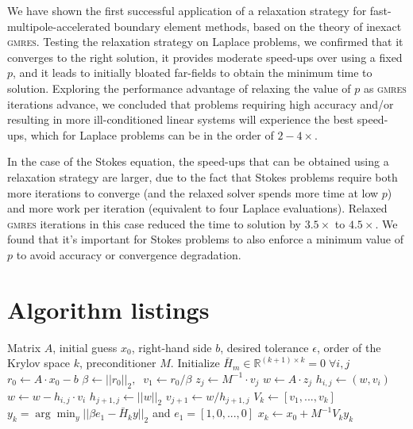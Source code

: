 \documentclass[final,leqno,]{siamltex1213}
\newcommand{\R}{\mathbb{R}}
\newcommand{\gmres}{\textsc{gmres}\xspace}
\begin{document}
We have shown the first successful application of a relaxation strategy for fast-multipole-accelerated boundary element methods, based on the theory of inexact \gmres. Testing the relaxation strategy on Laplace problems, we confirmed that it converges to the right solution, it provides moderate speed-ups over using a fixed $p$, and it leads to initially bloated far-fields to obtain the minimum time to solution.
Exploring the performance advantage of relaxing the value of $p$ as \gmres iterations advance, we concluded that problems requiring high accuracy and/or resulting in more ill-conditioned linear systems will experience the best speed-ups, which for Laplace problems can be in the order of $2-4\times$.

In the case of the Stokes equation, the speed-ups that can be obtained using a relaxation strategy are larger, due to the fact that Stokes problems require both more iterations to converge (and the relaxed solver spends more time at low $p$) and more work per iteration (equivalent to four Laplace evaluations). Relaxed \gmres iterations in this case reduced the time to solution by $3.5\times$ to $4.5\times$. We found that it's important for Stokes problems to also enforce a minimum value of $p$ to avoid accuracy or convergence degradation.


\Appendix
\section{Algorithm listings}\label{sec:algorithms}
 
 \begin{algorithm}
 \footnotesize
	\caption{Right-preconditioned \gmres\ \cite{SaadSchultz1986}.}
	\label{alg:gmres}
	\begin{algorithmic}
		\Require Matrix $A$, initial guess $x_{0}$, right-hand side $b$, desired tolerance $\epsilon$, order of the Krylov space $k$, preconditioner $M$.
		\State Initialize $\bar{H}_{m} \in \R^{(k+1)\times k} = 0\;\forall i,j$
		\State $r_{0} \gets A\cdot x_{0}-b$
		\State $\beta \gets ||r_{0}||_{2},\;\; v_{1} \gets r_{0}/\beta$
			\State $z_{j} \gets M^{-1}\cdot v_{j}$
			\State $w \gets A\cdot z_{j}$
				\State $h_{i,j} \gets (w, v_{i})$
				\State $w \gets w - h_{i,j}\cdot v_{i}$
			\EndFor
			\State $h_{j+1,j} \gets ||w||_{2}$
			\State $v_{j+1} \gets w / h_{j+1,j}$
		\EndFor
		\State $V_{k} \gets [ v_{1}, ..., v_{k}]$
		\State $y_{k} = \arg\min_{y}||\beta e_{1} - \bar{H}_{k}y||_{2}$ and $e_{1} = [1,0,...,0]$
		\State $x_{k} \gets x_{0} + M^{-1}V_{k}y_{k}$ 
	\end{algorithmic}
\end{algorithm}
 
\end{document}
